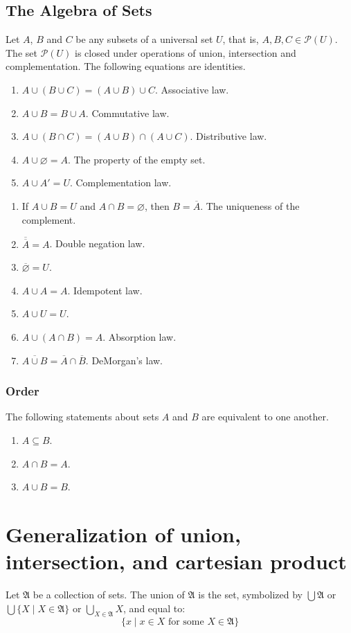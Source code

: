 \documentclass[letterpaper, 10pt]{article}
\newcommand{\set}[1]{\{#1\}}
\newcommand{\family}[1]{\mathfrak{#1}}
\newcommand{\powerset}[1]{\mathcal{P}(#1)}
\begin{document}
	\subsection{The Algebra of Sets}
	Let $A$, $B$ and $C$ be any subsets of a universal set $U$, that is, $A,B,C
	\in \powerset{U}$. The set $\powerset{U}$ is closed under operations of
	union, intersection and complementation.
	The following equations are identities.
	\begin{enumerate}
		\item $A\cup(B\cup C) = (A\cup B)\cup C$. Associative law.
		\item $A\cup B = B\cup A$. Commutative law.
		\item $A\cup(B\cap C) = (A\cup B)\cap(A\cup C)$. Distributive law.
		\item $A\cup \varnothing = A$. The property of the empty set.
		\item $A\cup A' = U$. Complementation law.
	\end{enumerate}

	\begin{enumerate}
		\item If $A\cup B = U$ and $A\cap B = \varnothing$, then $B =
			\overline{A}$. The uniqueness of the complement.
		\item $\overline{\overline{A}} = A$. Double negation law.
		\item $\overline{\varnothing} = U$.
		\item $A \cup A = A$. Idempotent law.
		\item $A \cup U = U$.
		\item $A \cup (A \cap B) = A$. Absorption law.
		\item $\overline{A \cup B} = \overline{A} \cap \overline{B}$. DeMorgan's
			law.
	\end{enumerate}

	\subsubsection{Order}
	The following statements about sets $A$ and $B$ are equivalent to one
	another.
	\begin{enumerate}
		\item $A \subseteq B$.
		\item $A \cap B = A$.
		\item $A \cup B = B$.
	\end{enumerate}

	\section{Generalization of union, intersection, and cartesian product}
	Let $\family{A}$ be a collection of sets. The union of $\family{A}$ is
	the set, symbolized by $\bigcup\family{A}$ or $\bigcup\set{X\mid X \in
	\family{A}}$ or $\bigcup_{X\in\family{A}}X$, and equal to:
	$$
	\set{x\mid x\in X \text{ for some } X\in\family{A}}
	$$
\end{document}
